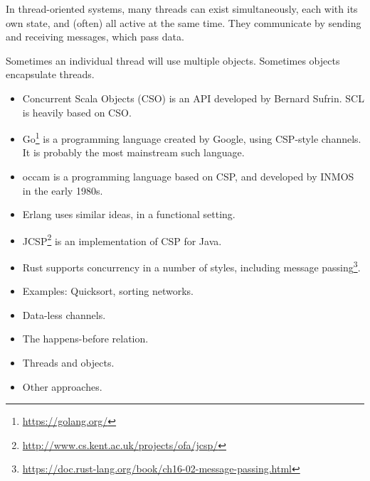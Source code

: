 In thread-oriented systems, many threads can exist simultaneously, each
with its own state, and (often) all active at the same time.  They communicate
by sending and receiving messages, which pass data.

Sometimes an individual thread will use multiple objects.  Sometimes objects
encapsulate threads.



\begin{itemize}
\item Concurrent Scala Objects (CSO) is an API developed by Bernard Sufrin.
  SCL is heavily based on CSO.

\item Go\footnote{\url{https://golang.org/}} is a programming language created
by Google, using CSP-style channels.  It is probably the most
mainstream such language.

\item
{\sf occam} is a programming language based on CSP, and developed by INMOS in
the early 1980s.

\item Erlang uses similar ideas, in a functional setting.

\item JCSP\footnote{\url{http://www.cs.kent.ac.uk/projects/ofa/jcsp/}} is an
implementation of CSP for Java.



\item Rust supports concurrency in a number of styles, including message
  passing\footnote{%
    \url{https://doc.rust-lang.org/book/ch16-02-message-passing.html}}. 

\end{itemize}





\begin{itemize}
\item Examples: Quicksort, sorting networks.

\item 
Data-less channels.

\item
The happens-before relation.

\item
Threads and objects.

\item
Other approaches.
\end{itemize}
